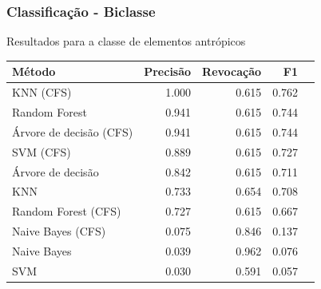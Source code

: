 \documentclass[t]{beamer}
\begin{document}
\begin{frame}[c]
	\frametitle{Classificação - Biclasse}

	\centering
	Resultados para a classe de elementos antrópicos

	\small{
		\begin{table}[h]
		\centering
		\begin{tabulary}{\linewidth}{|L|R|R|R|R|}
		\hline
		\textbf{Método} & \textbf{Precisão} & \textbf{Revocação} & \textbf{F1} \\ \hline
		KNN (CFS)               & 1.000 & 0.615 & 0.762 \\ \hline
		Random Forest           & 0.941 & 0.615 & 0.744 \\ \hline
		Árvore de decisão (CFS) & 0.941 & 0.615 & 0.744 \\ \hline
		SVM (CFS)               & 0.889 & 0.615 & 0.727 \\ \hline
		Árvore de decisão       & 0.842 & 0.615 & 0.711 \\ \hline
		KNN                     & 0.733 & 0.654 & 0.708 \\ \hline
		Random Forest (CFS)     & 0.727 & 0.615 & 0.667 \\ \hline
		Naive Bayes (CFS)       & 0.075 & 0.846 & 0.137 \\ \hline
		Naive Bayes             & 0.039 & 0.962 & 0.076 \\ \hline
		SVM                     & 0.030 & 0.591 & 0.057 \\ \hline
		\end{tabulary}
		\end{table}
	}
\end{frame}
\end{document}
